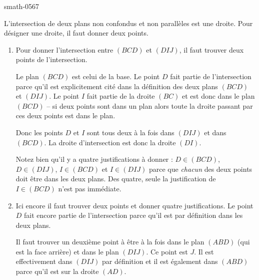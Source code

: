 
\begin{corrige}{smath-0567}

    L'intersection de deux plans non confondus et non parallèles est une droite. Pour désigner une droite, il faut donner deux points.
    \begin{enumerate}
        \item

            Pour donner l'intersection entre \( (BCD)\) et \( (DIJ)\), il faut trouver deux points de l'intersection. 

            Le plan \( (BCD)\) est celui de la base. Le point \( D\) fait partie de l'intersection parce qu'il est explicitement cité dans la définition des deux plans \( (BCD)\) et \( (DIJ)\). Le point \( I\) fait partie de la droite \( (BC)\) et est donc dans le plan \( (BCD)\) -- si deux points sont dans un plan alors toute la droite passant par ces deux points est dans le plan.

            Donc les points \( D\) et \( I\) sont tous deux à la fois dans \( (DIJ)\) et dans \( (BCD)\). La droite d'intersection est donc la droite \( (DI)\).

            Notez bien qu'il y a quatre justifications à donner : \( D\in (BCD)\), \( D\in(DIJ)\), \( I\in (BCD)\) et \( I\in(DIJ)\) parce que \emph{chacun} des deux points doit être dans les deux plans. Des quatre, seule la justification de \( I\in (BCD)\) n'est pas immédiate.

        \item
            
            Ici encore il faut trouver deux points et donner quatre justifications. Le point \( D\) fait encore partie de l'intersection parce qu'il est par définition dans les deux plans.

            Il faut trouver un deuxième point à être à la fois dans le plan \( (ABD)\) (qui est la face arrière) et dans le plan \( (DIJ)\). Ce point est \( J\). Il est effectivement dans \( (DIJ)\) par définition et il est également dans \( (ABD)\) parce qu'il est sur la droite \( (AD)\).

    \end{enumerate}

\end{corrige}
